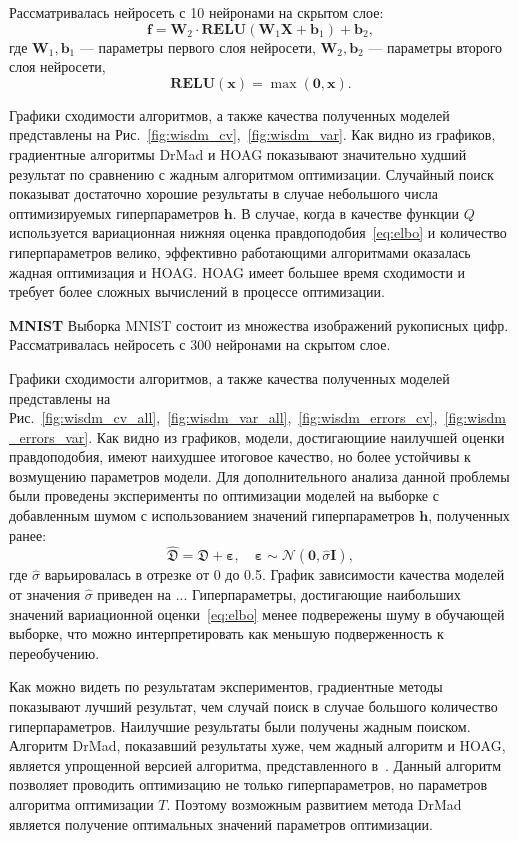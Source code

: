 Рассматривалась нейросеть с 10 нейронами на скрытом слое:
\[
    \mathbf{f} = \mathbf{W}_2 \cdot \textbf{RELU}(\mathbf{W}_1\mathbf{X} + \mathbf{b}_1) +\mathbf{b}_2,
\]
где $\mathbf{W}_1, \mathbf{b}_1$ --- параметры первого слоя нейросети,
$\mathbf{W}_2, \mathbf{b}_2$ --- параметры второго слоя нейросети,
\[
    \textbf{RELU}(\mathbf{x}) = \max(\mathbf{0}, \mathbf{x}).
\]

Графики сходимости алгоритмов, а также качества полученных моделей представлены на Рис.~\ref{fig:wisdm_cv},~\ref{fig:wisdm_var}.
Как видно из графиков, градиентные алгоритмы DrMad и HOAG показывают значительно худший результат по сравнению с жадным алгоритмом оптимизации. Случайный поиск показыват достаточно хорошие результаты в случае небольшого числа оптимизируемых гиперпараметров $\mathbf{h}$. В случае, когда в качестве функции $Q$ используется вариационная нижняя оценка правдоподобия~\eqref{eq:elbo} и количество гиперпараметров велико, эффективно работающими алгоритмами оказалась жадная оптимизация и HOAG. HOAG имеет большее время сходимости и требует более сложных вычислений в процессе оптимизации.


\textbf{MNIST}
Выборка MNIST состоит из множества изображений рукописных цифр.
Рассматривалась нейросеть с 300 нейронами на скрытом слое.

Графики сходимости алгоритмов, а также качества полученных моделей представлены на Рис.~\ref{fig:wisdm_cv_all},~\ref{fig:wisdm_var_all},~\ref{fig:wisdm_errors_cv},~\ref{fig:wisdm_errors_var}.
Как видно из графиков, модели, достигающиие наилучшей оценки правдоподобия, имеют наихудшее итоговое качество, но более устойчивы к возмущению параметров модели. Для дополнительного анализа данной проблемы были проведены эксперименты по оптимизации моделей на выборке с добавленным шумом с использованием значений гиперпараметров $\mathbf{h}$, полученных ранее:
\[
    \hat{\mathfrak{D}} = \mathfrak{D} + \boldsymbol{\varepsilon}, \quad   \boldsymbol{\varepsilon} \sim \mathcal{N}(\mathbf{0}, \hat{\sigma}\mathbf{I}),
\]
где $\hat{\sigma}$ варьировалась в отрезке от 0 до 0.5.
График зависимости качества моделей от значения $\hat{\sigma}$ приведен на ... Гиперпараметры, достигающие наибольших значений вариационной оценки~\eqref{eq:elbo} менее подвережены шуму в обучающей выборке, что можно интерпретировать как меньшую подверженность к переобучению.

Как можно видеть по результатам экспериментов, градиентные методы показывают лучший результат, чем случай поиск в случае большого количество гиперпараметров. Наилучшие результаты были получены жадным поиском. Алгоритм DrMad, показавший результаты хуже, чем жадный алгоритм и HOAG, является упрощенной версией алгоритма, представленного в~\cite{hyper_mad}. Данный алгоритм позволяет проводить оптимизацию не только гиперпараметров, но параметров алгоритма оптимизации $T$. Поэтому возможным развитием  метода DrMad является получение оптимальных значений параметров оптимизации.

